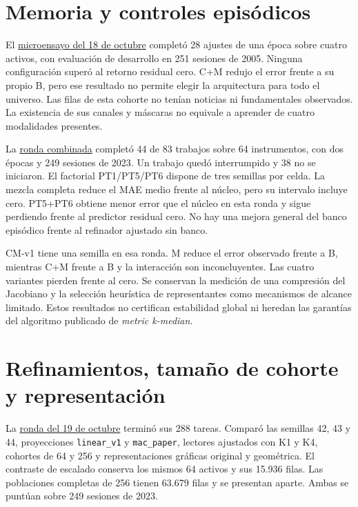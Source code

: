 \documentclass[11pt,a4paper]{report}
\begin{document}
\section{Memoria y controles episódicos}
El \href{https://github.com/GonxKZ/mars-titan/blob/8b7e2a5600be568cc1299f2a661da15b5090c45e/reports/research/memory-microstudy-20261018/README.md}{microensayo del 18 de octubre}
completó 28 ajustes de una época sobre cuatro activos, con evaluación de
desarrollo en 251 sesiones de 2005. Ninguna configuración superó al retorno
residual cero. C+M redujo el error frente a su propio B, pero ese resultado no
permite elegir la arquitectura para todo el universo. Las filas de esta
cohorte no tenían noticias ni fundamentales observados. La existencia de sus
canales y máscaras no equivale a aprender de cuatro modalidades presentes.

La \href{https://github.com/GonxKZ/mars-titan/blob/8b7e2a5600be568cc1299f2a661da15b5090c45e/reports/research/combined-memory-20261018/README.md}{ronda combinada}
completó 44 de 83 trabajos sobre 64 instrumentos, con dos épocas y 249 sesiones
de 2023. Un trabajo quedó interrumpido y 38 no se iniciaron. El factorial
PT1/PT5/PT6 dispone de tres semillas por celda. La mezcla completa reduce el
MAE medio frente al núcleo, pero su intervalo incluye cero. PT5+PT6 obtiene
menor error que el núcleo en esta ronda y sigue perdiendo frente al predictor
residual cero. No hay una mejora general del banco episódico frente al
refinador ajustado sin banco.

CM-v1 tiene una semilla en esa ronda. M reduce el error observado frente a B,
mientras C+M frente a B y la interacción son inconcluyentes. Las cuatro
variantes pierden frente al cero. Se conservan la medición de una compresión
del Jacobiano y la selección heurística de representantes como mecanismos de
alcance limitado. Estos resultados no certifican estabilidad global ni
heredan las garantías del algoritmo publicado de \emph{metric k-median}.

\section{Refinamientos, tamaño de cohorte y representación}
La \href{https://github.com/GonxKZ/mars-titan/blob/8b7e2a5600be568cc1299f2a661da15b5090c45e/reports/research/refinement-development-20261019/completed-v1/README.md}{ronda del 19 de octubre}
terminó sus 288 tareas. Comparó las semillas 42, 43 y 44, proyecciones
\texttt{linear\_v1} y \texttt{mac\_paper}, lectores ajustados con K1 y K4,
cohortes de 64 y 256 y representaciones gráficas original y geométrica.
El contraste de escalado conserva los mismos 64 activos y sus 15.936 filas.
Las poblaciones completas de 256 tienen 63.679 filas y se presentan aparte.
Ambas se puntúan sobre 249 sesiones de 2023.
\end{document}
